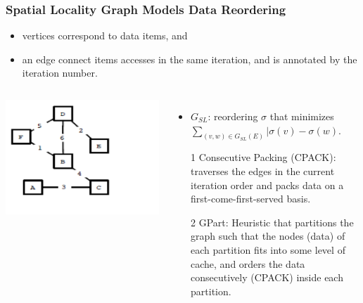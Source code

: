 \documentclass{beamer}
\newcommand{\emp}[1]{\textcolor{DikuRed}{ #1}}
\begin{document}
\begin{frame}[fragile,t]
  \frametitle{Spatial Locality Graph Models Data Reordering}

\begin{itemize}
    \item vertices correspond to data items, and 
    \item an edge connect items accesses in the same 
            iteration, and is annotated by the iteration
            number.
\end  {itemize}

\begin{columns}
\includegraphics[width=44ex]{Figures/SpatLocGraph}
\begin{itemize}
\item $G_{SL}$: reordering $\sigma$ that minimizes
        $\sum_{(v,w)\in G_{SL}(E)} |\sigma(v)-\sigma(w)$.
\item[1] \emp{Consecutive Packing (CPACK)}: traverses
            the edges in the current iteration order
            and packs data on a first-come-first-served basis.\smallskip


\item[2] \emp{GPart}: Heuristic that partitions the 
            graph such that the nodes (data) of each partition 
            fits into some level
            of cache, and orders the data consecutively (CPACK) inside
            each partition.
\end{itemize}
\end{columns}

 
\end{frame}
\end{document}
